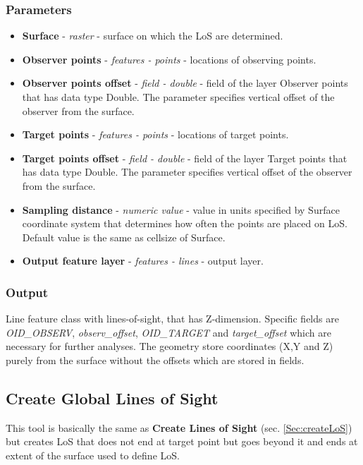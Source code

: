 \documentclass[]{article}
\begin{document}
\subsubsection{Parameters}
\begin{itemize}
	\item \textbf{Surface} - \textit{raster} - surface on which the LoS are determined.
	\item \textbf{Observer points} - \textit{features - points} - locations of observing points.
	\item \textbf{Observer points offset} - \textit{field - double} - field of the layer Observer points that has data type Double. The parameter specifies vertical offset of the observer from the surface.
	\item \textbf{Target points} -  \textit{features - points} - locations of target points.
	\item \textbf{Target points offset} - \textit{field - double} - field of the layer Target points that has data type Double. The parameter specifies vertical offset of the observer from the surface. 
	\item \textbf{Sampling distance} - \textit{numeric value} - value in units specified by Surface coordinate system that determines how often the points are placed on LoS. Default value is the same as cellsize of Surface.
	\item \textbf{Output feature layer} - \textit{features - lines} - output layer.
\end{itemize}

\subsubsection{Output}

Line feature class with lines-of-sight, that has Z-dimension. Specific fields are \textit{OID\_OBSERV}, \textit{observ\_offset}, \textit{OID\_TARGET} and \textit{target\_offset} which are necessary for further analyses. The geometry store coordinates (X,Y and Z) purely from the surface without the offsets which are stored in fields.

\subsection{Create Global Lines of Sight}

This tool is basically the same as \textbf{Create Lines of Sight} (sec. \ref{Sec:createLoS}) but creates LoS that does not end at target point but goes beyond it and ends at extent of the surface used to define LoS.
\end{document}
